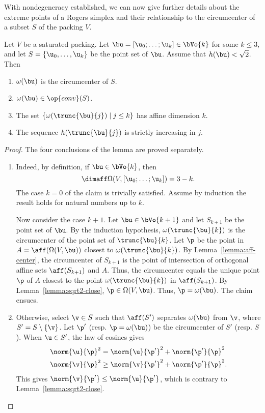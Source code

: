 \begin{cnl}
With nondegeneracy established, we can now give further details about
the extreme points of a Rogers simplex and their relationship to the
circumcenter of a subset $S$ of the packing $V$.

\begin{lemma}
\label{lemma:v2} 
Let $V$ be a saturated packing.
Let $\bu=\listdots{\u}{0}{k}\in \bVo{k}$ for some $k\le 3$,
and let $S=\setenumdots{\u}{0}{k}$ be the
point set of $\bu$.
Assume that $h(\bu)<\sqrt2$.
Then 
\begin{enumerate} 
\item%
$\omega(\bu)$ is the circumcenter of $S$.
\item%
$\omega(\bu)\in\op{conv}(S)$.
\item%
The set $\setcomp{\omega(\trunc{\bu}{j})}{ j\le k}$ has affine dimension $k$.
\item
The sequence $h(\trunc{\bu}{j})$ is
strictly increasing in $j$.
\end{enumerate}
\end{lemma}
%

\begin{proof} The four conclusions of the lemma  are proved
separately.

\begin{enumerate}
\item {}
  Indeed, by definition, if $\bu\in \bVo{k}$, then
\[  
\dimaff\Omega(V,\listdots{\u}{0}{k}) = 3-k.
\]   
The case $k=0$ of the claim is trivially satisfied.  Assume by
induction the result holds for natural numbers up to $k$.

Now consider the case $k+1$.  Let $\bu\in \bVo{k+1}$ and let $S_{k+1}$ be the
point set of $\bu$.  By the induction hypothesis,
$\omega(\trunc{\bu}{k})$ is the circumcenter of the point set of
$\trunc{\bu}{k}$.  Let $\p$ be the point in $A=\aff(\Omega(V,\bu))$
closest to $\omega(\trunc{\bu}{k})$.  By Lemma~\ref{lemma:aff-center},
the circumcenter of $S_{k+1}$ is the point of intersection of orthogonal
affine sets $\aff(S_{k+1})$ and $A$.  Thus, the circumcenter equals the
unique point $\p$ of $A$ closest to the point $\omega(\trunc{\bu}{k})$ in
$\aff(S_{k+1})$.  By Lemma~\ref{lemma:sqrt2-close}, $\p\in\Omega(V,\bu)$.
Thus, $\p=\omega(\bu)$.  The claim ensues.

\item{}  Otherwise, select
  $\v\in S$ such that $\aff(S')$ separates $\omega(\bu)$ from $ \v$,
  where $S'=S\setminus\braced{\v}$.  Let $\p'$ (resp. $\p=\omega(\bu)$) be
  the circumcenter of $S'$ (resp. $S$).  When $\u\in S'$, the law of
  cosines gives
\begin{align*} 
\norm{ \u}{\p}^2 &= \norm{\u}{\p'}^2 + \norm{\p'}{\p}^2\\ 
\norm{ \v}{\p}^2 &\ge \norm{\v}{\p'}^2 + \norm{\p'}{\p}^2.
\end{align*}
This gives $\norm{\v}{\p'}\le \norm{\u}{\p'}$, which is contrary to
Lemma~\ref{lemma:sqrt2-close}.


\end{enumerate}
\end{proof}
\end{cnl}
